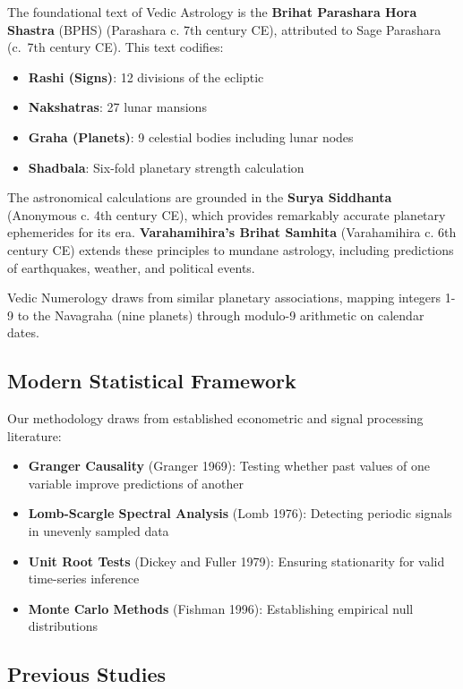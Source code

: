 \documentclass[
  11pt,
  a4paper,
  oneside,
  openany]{article}
\providecommand{\tightlist}{%
  \setlength{\itemsep}{0pt}\setlength{\parskip}{0pt}}\usepackage{longtable,booktabs,array}
\begin{document}
The foundational text of Vedic Astrology is the \textbf{Brihat Parashara
Hora Shastra} (BPHS) (Parashara c. 7th century CE), attributed to Sage
Parashara (c.~7th century CE). This text codifies:

\begin{itemize}
\tightlist
\item
  \textbf{Rashi (Signs)}: 12 divisions of the ecliptic
\item
  \textbf{Nakshatras}: 27 lunar mansions
\item
  \textbf{Graha (Planets)}: 9 celestial bodies including lunar nodes
\item
  \textbf{Shadbala}: Six-fold planetary strength calculation
\end{itemize}

The astronomical calculations are grounded in the \textbf{Surya
Siddhanta} (Anonymous c. 4th century CE), which provides remarkably
accurate planetary ephemerides for its era. \textbf{Varahamihira's
Brihat Samhita} (Varahamihira c. 6th century CE) extends these
principles to mundane astrology, including predictions of earthquakes,
weather, and political events.

Vedic Numerology draws from similar planetary associations, mapping
integers 1-9 to the Navagraha (nine planets) through modulo-9 arithmetic
on calendar dates.

\subsection{Modern Statistical
Framework}\label{modern-statistical-framework}

Our methodology draws from established econometric and signal processing
literature:

\begin{itemize}
\tightlist
\item
  \textbf{Granger Causality} (Granger 1969): Testing whether past values
  of one variable improve predictions of another
\item
  \textbf{Lomb-Scargle Spectral Analysis} (Lomb 1976): Detecting
  periodic signals in unevenly sampled data
\item
  \textbf{Unit Root Tests} (Dickey and Fuller 1979): Ensuring
  stationarity for valid time-series inference
\item
  \textbf{Monte Carlo Methods} (Fishman 1996): Establishing empirical
  null distributions
\end{itemize}

\subsection{Previous Studies}\label{previous-studies}
\end{document}
